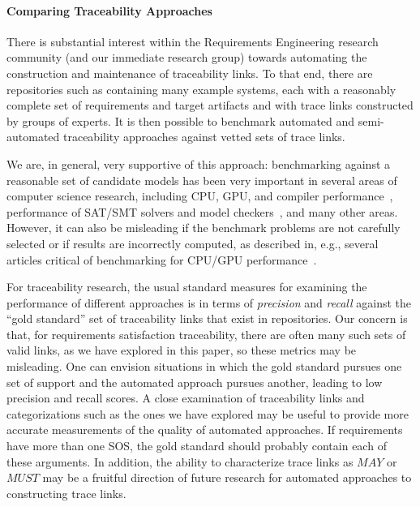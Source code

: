 \paragraph{Comparing Traceability Approaches}
There is substantial interest within the Requirements Engineering research community (and our immediate research group) towards automating the construction and maintenance of traceability links.  To that end, there are repositories such as  containing many example systems, each with a reasonably complete set of requirements and target artifacts and with trace links constructed by groups of experts.  It is then possible to benchmark automated and semi-automated traceability approaches against vetted sets of trace links.

We are, in general, very supportive of this approach: benchmarking against a reasonable set of candidate models has been very important in several areas of computer science research, including CPU, GPU, and compiler performance~, performance of SAT/SMT solvers and model checkers~, and many other areas.  However, it can also be misleading if the benchmark problems are not carefully selected or if results are incorrectly computed, as described in, e.g., several articles critical of benchmarking for CPU/GPU performance~.

For traceability research, the usual standard measures for examining the performance of different approaches is in terms of {\em precision} and {\em recall} against the ``gold standard'' set of traceability links that exist in repositories.  Our concern is that, for requirements satisfaction traceability, there are often many such sets of valid links, as we have explored in this paper, so these metrics may be misleading.  One can envision situations in which the gold standard pursues one set of support and the automated approach pursues another, leading to low precision and recall scores.  A close examination of traceability links and categorizations such as the ones we have explored may be useful to provide more accurate measurements of the quality of automated approaches.  If requirements have more than one SOS, the gold standard should probably contain each of these arguments.  In addition, the ability to characterize trace links as $MAY$ or $MUST$ may be a fruitful direction of future research for automated approaches to constructing trace links.


